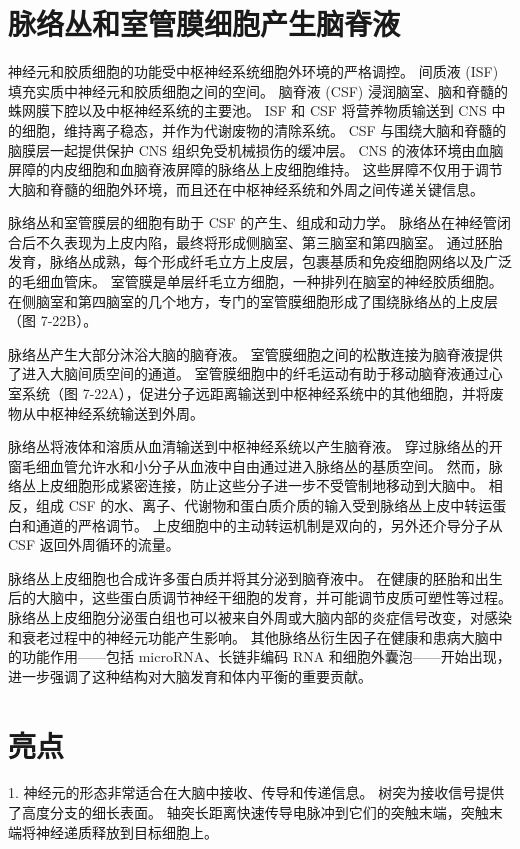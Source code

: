 \section{脉络丛和室管膜细胞产生脑脊液}

神经元和胶质细胞的功能受中枢神经系统细胞外环境的严格调控。 
间质液 (ISF) 填充实质中神经元和胶质细胞之间的空间。 
脑脊液 (CSF) 浸润脑室、脑和脊髓的蛛网膜下腔以及中枢神经系统的主要池。 
ISF 和 CSF 将营养物质输送到 CNS 中的细胞，维持离子稳态，并作为代谢废物的清除系统。 
CSF 与围绕大脑和脊髓的脑膜层一起提供保护 CNS 组织免受机械损伤的缓冲层。 
CNS 的液体环境由血脑屏障的内皮细胞和血脑脊液屏障的脉络丛上皮细胞维持。 
这些屏障不仅用于调节大脑和脊髓的细胞外环境，而且还在中枢神经系统和外周之间传递关键信息。


脉络丛和室管膜层的细胞有助于 CSF 的产生、组成和动力学。 
脉络丛在神经管闭合后不久表现为上皮内陷，最终将形成侧脑室、第三脑室和第四脑室。 
通过胚胎发育，脉络丛成熟，每个形成纤毛立方上皮层，包裹基质和免疫细胞网络以及广泛的毛细血管床。 
室管膜是单层纤毛立方细胞，一种排列在脑室的神经胶质细胞。 
在侧脑室和第四脑室的几个地方，专门的室管膜细胞形成了围绕脉络丛的上皮层（图 7-22B）。


脉络丛产生大部分沐浴大脑的脑脊液。 
室管膜细胞之间的松散连接为脑脊液提供了进入大脑间质空间的通道。 
室管膜细胞中的纤毛运动有助于移动脑脊液通过心室系统（图 7-22A），促进分子远距离输送到中枢神经系统中的其他细胞，并将废物从中枢神经系统输送到外周。


脉络丛将液体和溶质从血清输送到中枢神经系统以产生脑脊液。 
穿过脉络丛的开窗毛细血管允许水和小分子从血液中自由通过进入脉络丛的基质空间。 
然而，脉络丛上皮细胞形成紧密连接，防止这些分子进一步不受管制地移动到大脑中。 
相反，组成 CSF 的水、离子、代谢物和蛋白质介质的输入受到脉络丛上皮中转运蛋白和通道的严格调节。 
上皮细胞中的主动转运机制是双向的，另外还介导分子从 CSF 返回外周循环的流量。


脉络丛上皮细胞也合成许多蛋白质并将其分泌到脑脊液中。 
在健康的胚胎和出生后的大脑中，这些蛋白质调节神经干细胞的发育，并可能调节皮质可塑性等过程。 
脉络丛上皮细胞分泌蛋白组也可以被来自外周或大脑内部的炎症信号改变，对感染和衰老过程中的神经元功能产生影响。 
其他脉络丛衍生因子在健康和患病大脑中的功能作用——包括 microRNA、长链非编码 RNA 和细胞外囊泡——开始出现，进一步强调了这种结构对大脑发育和体内平衡的重要贡献。


\section{亮点}

1. 神经元的形态非常适合在大脑中接收、传导和传递信息。 
树突为接收信号提供了高度分支的细长表面。 
轴突长距离快速传导电脉冲到它们的突触末端，突触末端将神经递质释放到目标细胞上。 


